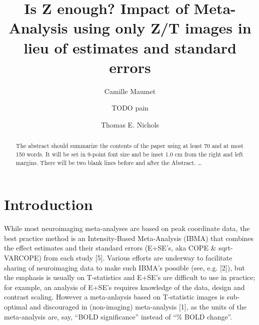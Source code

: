 \documentclass{llncs}
\begin{document}
%
\frontmatter          %
%
\pagestyle{headings}  %
%
%
\mainmatter              %
%
\title{Is Z enough? Impact of Meta-Analysis using only Z/T images in lieu of estimates and standard errors}
%
%
\author{Camille Maumet \and TODO pain
\and Thomas E. Nichols}
%
%
%

\maketitle              %

\begin{abstract}
The abstract should summarize the contents of the paper
using at least 70 and at most 150 words. It will be set in 9-point
font size and be inset 1.0 cm from the right and left margins.
There will be two blank lines before and after the Abstract. \dots
{}
\end{abstract}
%
\section{Introduction}
While most neuroimaging meta-analyses are based on peak coordinate data, the best practice method is an Intensity-Based Meta-Analysis (IBMA) that combines the effect estimates and their standard errors (E+SE's, aka COPE \& sqrt-VARCOPE) from each study [5]. Various efforts are underway to facilitate sharing of neuroimaging data to make such IBMA's possible (see, e.g. [2]), but the emphasis is usually on T-statistics and E+SE's are difficult to use in practice; for example, an analysis of E+SE's requires knowledge of the data, design and contrast scaling. However a meta-anlaysis based on T-statistic images is sub-optimal and discouraged in (non-imaging) meta-analysis [1], as the units of the meta-analysis are, say, ``BOLD significance'' instead of ``\% BOLD change''.
\end{document}
